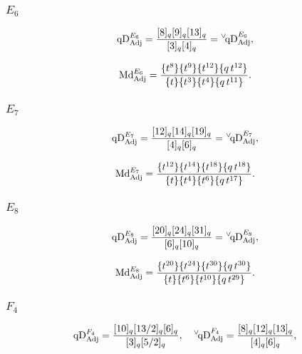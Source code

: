 \documentclass{article}
\def\MD{\hbox{Md}}%
\def\qDv{{^\vee\!\hbox{qD}}}
\def\qD{\hbox{qD}}
\def\MD{\hbox{Md}}%
\def\qDv{{^\vee\!\hbox{qD}}}
\def\qD{\hbox{qD}}
\def\Adj{\text{Adj}}
\begin{document}
\subsubsection{$E_6$}
\begin{equation}
    \qD_{\Adj}^{E_6} = \frac{[8]_q[9]_q[13]_q}{[3]_q[4]_q} = \qDv_{\Adj}^{E_6},
\end{equation}

\begin{equation}
    \MD^{E_6}_{\Adj} = \frac{\{t^8\}
   \{t^9\}
  \{t^{12}\} \{q\,
   t^{12}\}}{\{t\}
   \{t^3\} \{t^4\}
  \{q \,t^{11}\}}.
  \label{MacDimE6}
\end{equation}

\subsubsection{$E_7$}

\begin{equation}
     \qD_{\Adj}^{E_7} = \frac{[12]_q[14]_q[19]_q}{[4]_q[6]_q}= \qDv_{\Adj}^{E_7},
\end{equation}

\begin{equation}
    \MD_{\Adj}^{E_7} =  \frac{\{t^{12}\} \{t^{14}\} \{t^{18}\}
   \{q\, t^{18}\}}{\{t\} \{t^4\}
   \{t^6\} \{q\, t^{17}\}}.
   \label{MacDimE7}
\end{equation}

\subsubsection{$E_8$}

\begin{equation}
     \qD_{\Adj}^{E_8} = \frac{[20]_q[24]_q[31]_q}{[6]_q[10]_q}=\qDv_{\Adj}^{E_8},
\end{equation}

\begin{equation}
     \MD_{\Adj}^{E_8} = \frac{\{t^{20}\}\{t^{24}\}\{t^{30}\}
   \{q\, t^{30}\}}{\{t\}\{t^6\}
  \{t^{10}\} \{q\, t^{29}\}}.
  \label{MacDimE8}
\end{equation}


\subsubsection{$F_4$}

\begin{equation}
\qD_{\Adj}^{F_4} = \frac{[10]_q[13/2]_q[6]_q}{[3]_q[5/2]_q}, \quad \qDv_{\Adj}^{F_4}  = \frac{[8]_q[12]_q[13]_q}{[4]_q[6]_q},
\end{equation}
\end{document}
